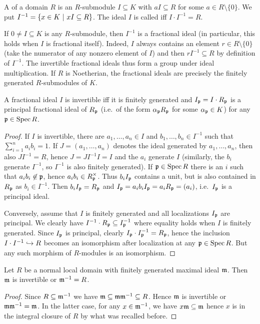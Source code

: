 \documentclass[a4paper,parskip=half,numbers=enddot, DIV=12]{scrreprt}
\begin{document}
\begin{defi}  %
    A  of a domain $R$ is an $R$-submodule $I\subseteq K$ with $a I \subseteq R$ for some $a\in R\setminus \{0\}$. We put $I^{-1} = \left\{x\in K\ \middle|\  xI\subseteq R\right\}$. The ideal $I$ is called  iff $I\cdot I^{-1}  = R$. 
\end{defi}
If $0\neq I\subseteq K$ is any $R$-submodule, then $I^{-1}$ is a fractional ideal (in particular, this holds when $I$ is fractional itself). Indeed, $I$ always contains an element $r\in R\setminus\{0\}$ (take the numerator of any nonzero element of $I$) and then $rI^{-1}\subseteq R$ by definition of $I^{-1}$. The invertible fractional ideals thus form a group under ideal multiplication. If $R$ is Noetherian, the fractional ideals are precisely the finitely generated $R$-submodules of $K$.
\begin{prop}
    A fractional ideal $I$ is invertible iff it is finitely generated and $I_{\mathfrak{p}}=I\cdot R_{\mathfrak{p}}$ is a principal fractional ideal of $R_{\mathfrak{p}}$ (i.e.\ of the form $\alpha_{\mathfrak{p}} R_{\mathfrak{p}}$ for some $\alpha_{\mathfrak{p}}\in K$) for any $\mathfrak{p}\in \operatorname{Spec} R$.
\end{prop}
\begin{proof}
    If $I$ is invertible, there are $a_1,\ldots,a_n\in I$ and $b_1,\ldots,b_n\in I^{-1}$ such that $\sum_{i=1}^n a_i b_i = 1$. If $J=(a_1,\ldots,a_n)$ denotes the ideal generated by $a_1,\ldots,a_n$, then also $JI^{-1}=R$, hence $J=JI^{-1}I=I$ and the $a_i$ generate $I$ (similarly, the $b_i$ generate $I^{-1}$, so $I^{-1}$ is also finitely generated). If $\mathfrak{p}\in \operatorname{Spec} R$ there is an $i$ such that $a_ib_i\not\in  \mathfrak{p}$, hence $a_ib_i\in R_{\mathfrak{p}}^\times$. Thus $b_iI_{\mathfrak{p}}$ contains a unit, but is also contained in $R_{\mathfrak{p}}$ as $b_i\in I^{-1}$. Then $b_iI_{\mathfrak{p}}=R_{\mathfrak{p}}$ and $I_{\mathfrak{p}}=a_ib_iI_{\mathfrak{p}}=a_iR_{\mathfrak{p}}=(a_i)$, i.e.\ $I_{\mathfrak{p}}$ is a principal ideal.
    
    Conversely, assume that $I$ is finitely generated and all localizations $I_{\mathfrak{p}}$ are principal. We clearly have $I^{-1}\cdot R_{\mathfrak{p}}\subseteq I_{\mathfrak{p}}^{-1}$ where equality holds when $I$ is finitely generated. Since $I_{\mathfrak{p}}$ is principal, clearly $I_{\mathfrak{p}}\cdot I_{\mathfrak{p}}^{-1} = R_{\mathfrak{p}}$, hence the inclusion $I\cdot I^{-1}\monomorphism R$ becomes an isomorphism after localization at any $\mathfrak{p}\in \operatorname{Spec} R$. But any such morphism of $R$-modules is an isomorphism.
\end{proof}
\begin{lem}
    Let $R$ be a normal local domain with finitely generated maximal ideal $\mathfrak{m}$. Then $\mathfrak{m}$ is invertible or $\mathfrak{m}^{-1} = R$.
\end{lem}
\begin{proof}
    Since $R\subseteq \mathfrak{m}^{-1}$ we have $\mathfrak{m}\subseteq \mathfrak{m} \mathfrak{m}^{-1} \subseteq R$. Hence $\mathfrak{m}$ is invertible or $\mathfrak{m}\mathfrak{m}^{-1} = \mathfrak{m}$. In the latter case, for any $x\in \mathfrak{m}^{-1}$, we have $x\mathfrak{m} \subseteq \mathfrak{m}$ hence $x$ is in the integral closure of $R$ by what was recalled before.
\end{proof}
\end{document}
